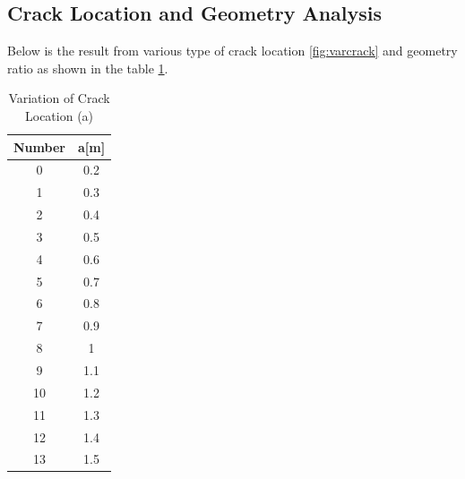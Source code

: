 \documentclass[a4paper,11pt]{article}
\begin{document}
\newpage
\subsection{Crack Location and Geometry Analysis}
Below is the result from various type of crack location \ref{fig:varcrack} and geometry ratio as shown in the table \ref{tab:avarloc}.
\begin{table}[h!]
	\centering
	\begin{tabular}{|c|c|}
		\hline
		Number	&	a[m]	\\
		\hline
		0	&	0.2	\\
		1	&	0.3	\\
		2	&	0.4	\\
		3	&	0.5	\\
		4	&	0.6	\\
		5	&	0.7	\\
		6	&	0.8	\\
		7	&	0.9	\\
		8	&	1	\\
		9	&	1.1	\\
		10	&	1.2	\\
		11	&	1.3	\\
		12	&	1.4	\\
		13	&	1.5	\\
		\hline
	\end{tabular}
	\caption{Variation of Crack Location (a)}
	\label{tab:avarloc}
\end{table}
\end{document}
